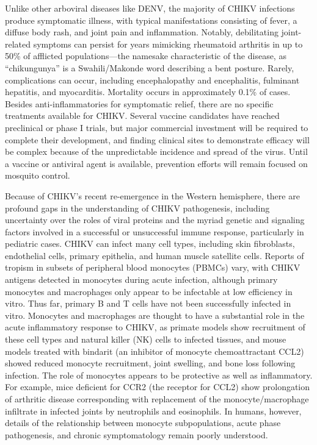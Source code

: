 Unlike other arboviral diseases like DENV, the majority of CHIKV infections produce symptomatic illness, with typical manifestations consisting of fever, a diffuse body rash, and joint pain and inflammation.\autocite{Couderc2015,Weaver2015} Notably, debilitating joint-related symptoms can persist for years mimicking rheumatoid arthritis in up to 50\% of afflicted populations—the namesake characteristic of the disease, as “chikungunya” is a Swahili/Makonde word describing a bent posture.\autocite{Miner2015,Weaver2015} Rarely, complications can occur, including encephalopathy and encephalitis, fulminant hepatitis, and myocarditis.\autocite{Rolph2015} Mortality occurs in approximately 0.1\% of cases.\autocite{Rolph2015} Besides anti-inflammatories for symptomatic relief, there are no specific treatments available for CHIKV.\autocite{Suhrbier2012,Weaver2015} Several vaccine candidates have reached preclinical or phase I trials,\autocite{Plante2015,Weger-Lucarelli2014} but major commercial investment will be required to complete their development, and finding clinical sites to demonstrate efficacy will be complex because of the unpredictable incidence and spread of the virus.\autocite{Weaver2015} Until a vaccine or antiviral agent is available, prevention efforts will remain focused on mosquito control.\autocite{Weaver2015}  

Because of CHIKV’s recent re-emergence in the Western hemisphere, there are profound gaps in the understanding of CHIKV pathogenesis, including uncertainty over the roles of viral proteins and the myriad genetic and signaling factors involved in a successful or unsuccessful immune response, particularly in pediatric cases.\autocite{Teng2015} CHIKV can infect many cell types, including skin fibroblasts, endothelial cells, primary epithelia, and human muscle satellite cells.\autocite{Couderc2015,Lum2015} Reports of tropism in subsets of peripheral blood monocytes (PBMCs) vary, with CHIKV antigens detected in monocytes during acute infection,\autocite{Her2010} although primary monocytes and macrophages only appear to be infectable at low efficiency in vitro.\autocite{Sourisseau2007,Teng2012a} Thus far, primary B and T cells have not been successfully infected in vitro.\autocite{Her2010,Sourisseau2007,Teng2012a} Monocytes and macrophages are thought to have a substantial role in the acute inflammatory response to CHIKV, as primate models show recruitment of these cell types and natural killer (NK) cells to infected tissues,\autocite{Labadie2010} and mouse models treated with bindarit (an inhibitor of monocyte chemoattractant CCL2) showed reduced monocyte recruitment, joint swelling, and bone loss following infection.\autocite{Chen2015,Rulli2011} The role of monocytes appears to be protective as well as inflammatory. For example, mice deficient for CCR2 (the receptor for CCL2) show prolongation of arthritic disease corresponding with replacement of the monocyte/macrophage infiltrate in infected joints by neutrophils and eosinophils.\autocite{Poo2014} In humans, however, details of the relationship between monocyte subpopulations, acute phase pathogenesis, and chronic symptomatology remain poorly understood.\autocite{Burt2017,Weaver2015}


